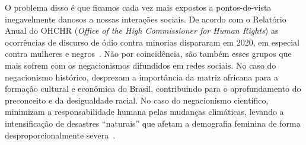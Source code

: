 \documentclass[
    report,
    11pt,
    oneside,
    a4paper,
    english,
    brazil,
    sumario=tradicional
    ]{abntex2}
\begin{document}
    O problema disso é que ficamos cada vez mais expostos a pontos-de-vista inegavelmente danosos a nossas interações sociais. De acordo com o Relatório Anual do OHCHR (\textit{Office of the High Commissioner for Human Rights}) as ocorrências de discurso de ódio contra minorias dispararam em 2020, em especial contra mulheres e negros~\cite{hate-speech-increasing}. Não por coincidência, são também esses grupos que mais sofrem com os negacionismos difundidos em redes sociais. No caso do negacionismo histórico, desprezam a importância da matriz africana para a formação cultural e econômica do Brasil, contribuindo para o aprofundamento do preconceito e da desigualdade racial. No caso do negacionismo científico, minimizam a responsabilidade humana pelas mudanças climáticas, levando a intensificação de desastres ``naturais'' que afetam a demografia feminina de forma desproporcionalmente severa~\cite{clima-mulheres}.

\nocite{manipulation-for-science, be-mean-online}

\pagebreak

\postextual


\end{document}
